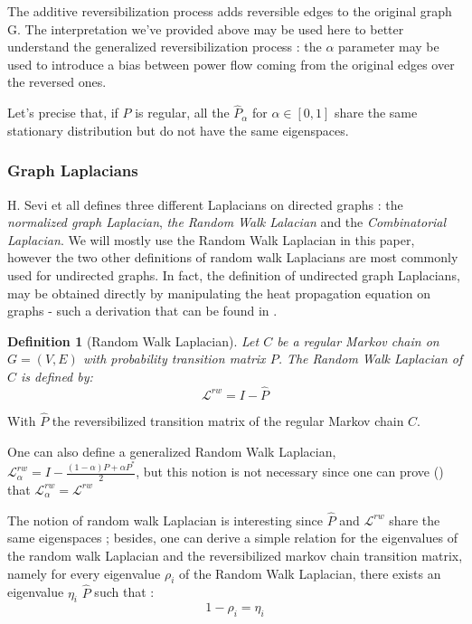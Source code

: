 \documentclass[sn-mathphys]{sn-jnl}%
\theoremstyle{thmstyleone}%
\theoremstyle{thmstyletwo}%
\theoremstyle{thmstylethree}%
\newtheorem{definition}[theo]{Definition}
\begin{document}
The additive reversibilization process adds reversible edges to the
original graph G. The interpretation we've provided above may be used
here to better understand the generalized reversibilization process :
the $\alpha$ parameter may be used to introduce a bias between power
flow coming from the original edges over the reversed ones.

Let's precise that, if $P$ is regular, all the $\hat{P}_\alpha$ for
$\alpha \in [0,1]$ share the same stationary distribution but do not
have the same eigenspaces.

\subsubsection{Graph Laplacians}

H. Sevi et all \cite{sevi2019} defines three different Laplacians on
directed graphs : the \textit{normalized graph Laplacian}, \textit{the
  Random Walk Lalacian} and the \textit{Combinatorial Laplacian}. We
will mostly use the Random Walk Laplacian in this paper, however the
two other definitions of random walk Laplacians are most commonly used
for undirected graphs. In fact, the definition of undirected graph
Laplacians, may be obtained directly by manipulating the heat
propagation equation on graphs - such a derivation that can be found
in \cite{ricaud_borgnat_tremblay_goncalves_vandergheynst_2019}.

\begin{definition}[Random Walk Laplacian]
Let $C$ be a regular Markov chain on $G=(V,E)$ with probability transition matrix $P$. The Random Walk Laplacian of $C$ is defined by:
\begin{equation}
    \mathcal{L}^{rw} = I - \hat{P}
\end{equation}

\end{definition}

With $\hat{P}$ the reversibilized transition matrix of the regular
Markov chain $C$.

One can also define a generalized Random Walk Laplacian,
$\mathcal{L}^{rw}_\alpha = I - \frac{(1-\alpha)P + \alpha P^* }{2}$,
but this notion is not necessary since one can prove (\cite{sevi2019})
that $\mathcal{L}^{rw}_\alpha = \mathcal{L}^{rw}$

The notion of random walk Laplacian is interesting since $\hat{P}$ and
$\mathcal{L}^{rw}$ share the same eigenspaces ; besides, one can
derive a simple relation for the eigenvalues of the random walk
Laplacian and the reversibilized markov chain transition matrix,
namely for every eigenvalue $\rho_i$ of the Random Walk Laplacian,
there exists an eigenvalue $\eta_i$ $\hat{P}$ such that :
\begin{equation}\label{eq:relation_laplacian_eigenvalues}
    1-\rho_i = \eta_i
\end{equation}
\end{document}
